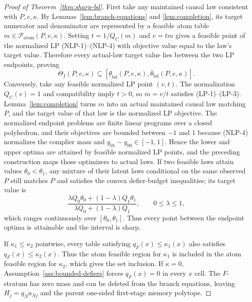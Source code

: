\documentclass[11pt]{article}
\theoremstyle{definition}
\theoremstyle{plain}
\theoremstyle{remark}
\begin{document}
\begin{proof}[Proof of Theorem~\ref{thm:sharp-bd}]
First take any maintained causal law consistent with \(P,e,\kappa\).
By Lemmas~\ref{lem:branch-equations} and \ref{lem:completion}, its target numerator and denominator are represented by a feasible atom table \(m\in\mathcal P_{\mathrm{atom}}(P,e,\kappa)\).
Setting \(t=1/Q_C(m)\) and \(v=t m\) gives a feasible point of the normalized LP (NLP-1)--(NLP-4) with objective value equal to the law's target value.
Therefore every actual-law target value lies between the two LP endpoints, proving
\[
\Theta_I(P;e,\kappa)\subseteq
[\underline\theta_{\mathrm{bd}}(P,e,\kappa),
\overline\theta_{\mathrm{bd}}(P,e,\kappa)].
\]
Conversely, take any feasible normalized LP point \((v,t)\).
The normalization \(Q_C(v)=1\) and compatibility imply \(t>0\), so \(m=v/t\) satisfies (LP-1)--(LP-3).
Lemma~\ref{lem:completion} turns \(m\) into an actual maintained causal law matching \(P\), and the target value of that law is the normalized LP objective.
The normalized endpoint problems are finite linear programs over a closed polyhedron, and their objectives are bounded between \(-1\) and \(1\) because (NLP-4) normalizes the complier mass and \(y_{01}-y_{00}\in[-1,1]\).
Hence the lower and upper optima are attained by feasible normalized LP points, and the preceding construction maps those optimizers to actual laws.
If two feasible laws attain values \(\theta_0<\theta_1\), any mixture of their latent laws conditional on the same observed \(P\) still matches \(P\) and satisfies the convex defier-budget inequalities; its target value is
\[
\frac{\lambda Q_0\theta_0+(1-\lambda)Q_1\theta_1}
{\lambda Q_0+(1-\lambda)Q_1},
\qquad 0\le\lambda\le1,
\]
which ranges continuously over \([\theta_0,\theta_1]\).
Thus every point between the endpoint optima is attainable and the interval is sharp.

If \(\kappa_1\le\kappa_2\) pointwise, every table satisfying \(q_F(x)\le\kappa_1(x)\) also satisfies \(q_F(x)\le\kappa_2(x)\).
Thus the atom feasible region for \(\kappa_1\) is included in the atom feasible region for \(\kappa_2\), which gives the set inclusion.
If \(\kappa=0\), Assumption~\ref{ass:bounded-defiers} forces \(q_F(x)=0\) in every \(x\) cell.
The \(F\)-stratum has zero mass and can be deleted from the branch equations, leaving \(H_j=q_N a_{Nj}\) and the parent one-sided first-stage memory polytope.
\end{proof}
\end{document}
